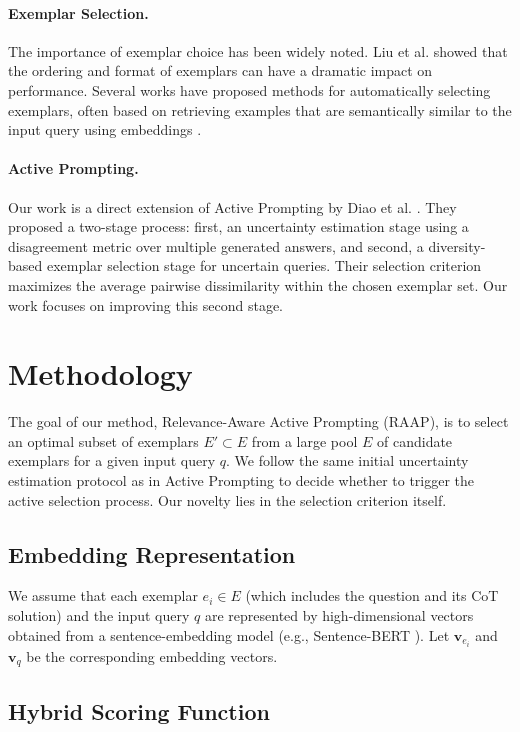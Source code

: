 \documentclass[10pt,twocolumn,letterpaper]{article}
\begin{document}
\paragraph{Exemplar Selection.} The importance of exemplar choice has been widely noted. Liu et al. \cite{liu2022makes} showed that the ordering and format of exemplars can have a dramatic impact on performance. Several works have proposed methods for automatically selecting exemplars, often based on retrieving examples that are semantically similar to the input query using embeddings \cite{rubin2021learning}.

\paragraph{Active Prompting.} Our work is a direct extension of Active Prompting by Diao et al. \cite{diao2023active}. They proposed a two-stage process: first, an uncertainty estimation stage using a disagreement metric over multiple generated answers, and second, a diversity-based exemplar selection stage for uncertain queries. Their selection criterion maximizes the average pairwise dissimilarity within the chosen exemplar set. Our work focuses on improving this second stage.

\section{Methodology}

The goal of our method, Relevance-Aware Active Prompting (RAAP), is to select an optimal subset of exemplars $E' \subset E$ from a large pool $E$ of candidate exemplars for a given input query $q$. We follow the same initial uncertainty estimation protocol as in Active Prompting \cite{diao2023active} to decide whether to trigger the active selection process. Our novelty lies in the selection criterion itself.

\subsection{Embedding Representation}

We assume that each exemplar $e_i \in E$ (which includes the question and its CoT solution) and the input query $q$ are represented by high-dimensional vectors obtained from a sentence-embedding model (e.g., Sentence-BERT \cite{reimers2019sentence}). Let $\mathbf{v}_{e_i}$ and $\mathbf{v}_q$ be the corresponding embedding vectors.

\subsection{Hybrid Scoring Function}
\end{document}
